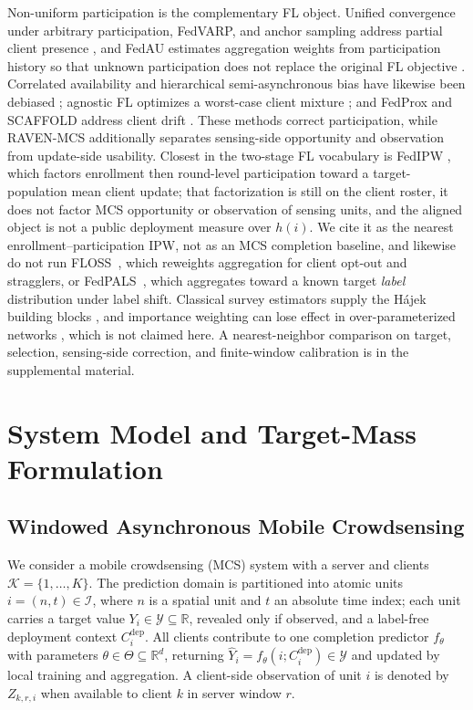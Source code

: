 \documentclass[letterpaper,journal]{IEEEtran}
\begin{document}
Non-uniform participation is the complementary FL object.  Unified convergence
under arbitrary participation, FedVARP, and anchor sampling address partial
client presence \cite{wang2022unified,jhunjhunwala2022fedvarp,wu2023anchor}, and
FedAU estimates aggregation weights from participation history so that unknown
participation does not replace the original FL objective
\cite{wang2024lightweight}.  Correlated availability and hierarchical
semi-asynchronous bias have likewise been debiased
\cite{sun2025debiasing,chen2026fedcure}; agnostic FL optimizes a worst-case
client mixture \cite{mohri2019agnostic}; and FedProx and SCAFFOLD address client
drift \cite{li2020fedprox,karimireddy2020scaffold}.  These methods correct
participation, while RAVEN-MCS additionally separates sensing-side opportunity
and observation from update-side usability.  Closest in the two-stage FL
vocabulary is FedIPW \cite{morishita2026who}, which factors enrollment then
round-level participation toward a target-population mean client update; that
factorization is still on the client roster, it does not factor MCS opportunity
or observation of sensing units, and the aligned object is not a public
deployment measure over $h(i)$.  We cite it as the nearest
enrollment--participation IPW, not as an MCS completion baseline, and likewise
do not run FLOSS~\cite{goetze2025floss}, which reweights aggregation for client
opt-out and stragglers, or FedPALS~\cite{listozec2024overcoming}, which
aggregates toward a known target \emph{label} distribution under label shift.
Classical survey estimators supply the H\'ajek building blocks
\cite{horvitz1952generalization,hajek1971comment,shimodaira2000covariate,robins1994estimation},
and importance weighting can lose effect in over-parameterized networks
\cite{byrd2019importance}, which is not claimed here.  A nearest-neighbor
comparison on target, selection, sensing-side correction, and finite-window
calibration is in the supplemental material.


\section{System Model and Target-Mass Formulation}
\label{sec:system_model}

\subsection{Windowed Asynchronous Mobile Crowdsensing}
\label{subsec:windowed_mcs}

We consider a mobile crowdsensing (MCS) system with a server and clients
$\mathcal{K}=\{1,\ldots,K\}$.  The prediction domain is partitioned into atomic
units $i=(n,t)\in\mathcal{I}$, where $n$ is a spatial unit and $t$ an absolute
time index; each unit carries a target value
$Y_i\in\mathcal{Y}\subseteq\mathbb{R}$, revealed only if observed, and a
label-free deployment context $C_i^{\mathrm{dep}}$.  All clients contribute to
one completion predictor $f_{\theta}$ with parameters
$\theta\in\Theta\subseteq\mathbb{R}^{d}$, returning
$\widehat Y_i=f_{\theta}(i;C_i^{\mathrm{dep}})\in\mathcal{Y}$ and updated by
local training and aggregation.  A client-side observation of unit $i$ is
denoted by $Z_{k,r,i}$ when available to client $k$ in server window $r$.
\end{document}
